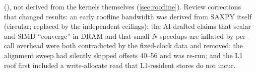 \begin{description}[style=nextline]
        (), not derived from the kernels themselves (\cref{sec:roofline}).
        Review corrections that changed results: an early roofline bandwidth was derived from
        SAXPY itself (circular; replaced by the independent ceilings); the AI-drafted claims that
        scalar and SIMD ``converge'' in DRAM and that small-$N$ speedups are inflated by per-call
        overhead were both contradicted by the fixed-clock data and removed; the alignment sweep had
        silently skipped offsets \qtyrange{40}{56}{\byte} and was re-run; and the L1 roof first
        included a write-allocate read that L1-resident stores do not incur.
\end{description}
